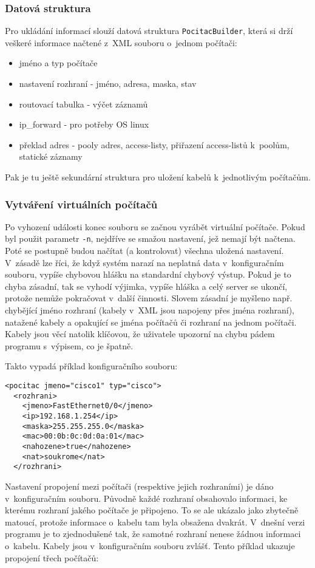 \subsubsection{Datová struktura}
Pro ukládání informací slouží datová struktura \verb|PocitacBuilder|, která si drží veškeré informace načtené z~XML souboru o~jednom počítači:
\begin{itemize}
 \item jméno a typ počítače
 \item nastavení rozhraní - jméno, adresa, maska, stav
 \item routovací tabulka - výčet záznamů
 \item ip\_forward - pro potřeby OS linux
 \item překlad adres - pooly adres, access-listy, přiřazení access-listů k~poolům, statické záznamy
\end{itemize}

Pak je tu ještě sekundární struktura pro uložení kabelů k~jednotlivým počítačům.

\subsubsection{Vytváření virtuálních počítačů}
Po vyhození události konec souboru se začnou vyrábět virtuální počítače. Pokud byl použit parametr \verb|-n|, nejdříve se smažou nastavení, jež nemají být načtena. Poté se postupně budou načítat (a kontrolovat) všechna uložená nastavení. V~zásadě lze říci, že když systém narazí na neplatná data v~konfiguračním souboru, vypíše chybovou hlášku na standardní chybový výstup. Pokud je to chyba zásadní, tak se vyhodí výjimka, vypíše hláška a celý server se ukončí, protože nemůže pokračovat v~další činnosti. Slovem zásadní je myšleno např. chybějící jméno rozhraní (kabely v~XML jsou napojeny přes jména rozhraní), natažené kabely a opakující se jména počítačů či rozhraní na jednom počítači. Kabely jsou věcí natolik klíčovou, že uživatele upozorní na chybu pádem programu s~výpisem, co je špatně. 

Takto vypadá příklad konfiguračního souboru:
\begin{verbatim}
<pocitac jmeno="cisco1" typ="cisco">
  <rozhrani>
    <jmeno>FastEthernet0/0</jmeno>
    <ip>192.168.1.254</ip>
    <maska>255.255.255.0</maska>
    <mac>00:0b:0c:0d:0a:01</mac>
    <nahozene>true</nahozene>
    <nat>soukrome</nat>
  </rozhrani>
\end{verbatim} 

Nastavení propojení mezi počítači (respektive jejich rozhraními) je dáno v~konfiguračním souboru. Původně každé rozhraní obsahovalo informaci, ke kterému rozhraní jakého počítače je připojeno. To se ale ukázalo jako zbytečně matoucí, protože informace o~kabelu tam byla obsažena dvakrát. V~dnešní verzi programu je to zjednodušené tak, že samotné rozhraní nenese žádnou informaci o~kabelu. Kabely jsou v~konfiguračním souboru zvlášť. Tento příklad ukazuje propojení třech počítačů:

